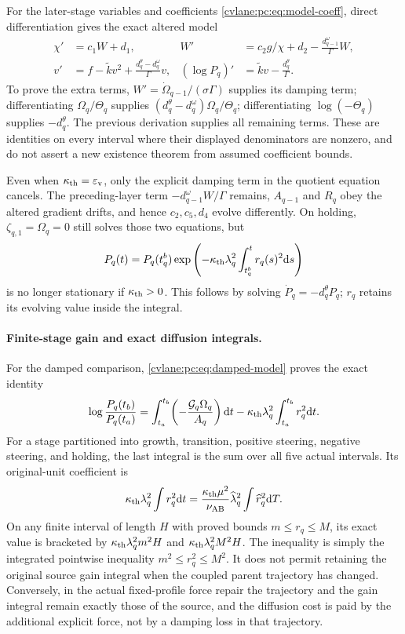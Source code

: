 For the later-stage variables and coefficients \eqref{cvlane:pc:eq:model-coeff}, direct differentiation gives the exact altered model
\begin{align}\label{cvlane:pc:eq:damped-model}
 \chi'&=c_1W+d_1,&
 W'&=c_2g/\chi+d_2-\frac{d_{q-1}^\omega}{\Gamma}W,\\
 v'&=f-\widetilde k v^2+\frac{d_q^\theta-d_q^\omega}{\Gamma}v,&
 (\log P_q)'&=\widetilde k v-\frac{d_q^\theta}{\Gamma}.\nonumber
\end{align}
To prove the extra terms, $W'=\dot\Omega_{q-1}/(\sigma\Gamma)$ supplies its damping term; differentiating $\Omega_q/\Theta_q$ supplies $(d_q^\theta-d_q^\omega)\Omega_q/\Theta_q$; differentiating $\log(-\Theta_q)$ supplies $-d_q^\theta$. The previous derivation supplies all remaining terms. These are identities on every interval where their displayed denominators are nonzero, and do not assert a new existence theorem from assumed coefficient bounds.

Even when $\kappa_{\mathrm{th}}=\varepsilon_{\mathrm v}$, only the explicit damping term in the quotient equation cancels. The preceding-layer term $-d_{q-1}^\omega W/\Gamma$ remains, $A_{q-1}$ and $R_q$ obey the altered gradient drifts, and hence $c_2,c_5,d_4$ evolve differently. On holding, $\zeta_{q,1}=\Omega_q=0$ still solves those two equations, but
\[
 P_q(t)=P_q(t_q^b)\exp\left(-\kappa_{\mathrm{th}}\lambda_q^2\int_{t_q^b}^{t}r_q(s)^2\mathrm d s\right)
\]
is no longer stationary if $\kappa_{\mathrm{th}}>0$. This follows by solving $\dot P_q=-d_q^\theta P_q$; $r_q$ retains its evolving value inside the integral.

\paragraph{Finite-stage gain and exact diffusion integrals.}
For the damped comparison, \eqref{cvlane:pc:eq:damped-model} proves the exact identity
\[
 \log\frac{P_q(t_b)}{P_q(t_a)}
 =\int_{t_a}^{t_b}\!\left(-\frac{\mathcal G_q\Omega_q}{A_q}\right)\mathrm d t
 -\kappa_{\mathrm{th}}\lambda_q^2\int_{t_a}^{t_b}r_q^2\mathrm d t.
\]
For a stage partitioned into growth, transition, positive steering, negative steering, and holding, the last integral is the sum over all five actual intervals. Its original-unit coefficient is
\[
 \kappa_{\mathrm{th}}\lambda_q^2\int r_q^2\mathrm d t
 =\frac{\kappa_{\mathrm{th}}\mu^2}{\nu_{\mathrm{AB}}}\widehat\lambda_q^2
 \int \widehat r_q^2\mathrm d T.
\]
On any finite interval of length $H$ with proved bounds $m\le r_q\le M$, its exact value is bracketed by $\kappa_{\mathrm{th}}\lambda_q^2m^2H$ and $\kappa_{\mathrm{th}}\lambda_q^2M^2H$. The inequality is simply the integrated pointwise inequality $m^2\le r_q^2\le M^2$. It does not permit retaining the original source gain integral when the coupled parent trajectory has changed. Conversely, in the actual fixed-profile force repair the trajectory and the gain integral remain exactly those of the source, and the diffusion cost is paid by the additional explicit force, not by a damping loss in that trajectory.

